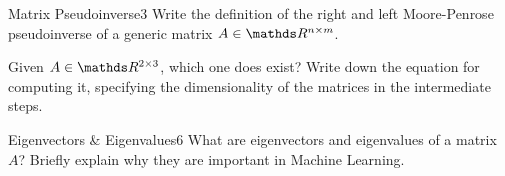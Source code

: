 \begin{questions}

\begin{question}{Matrix Pseudoinverse}{3}
	Write the definition of the right and left Moore-Penrose pseudoinverse of a generic matrix $A \in \R^{n\times m}$.
	
	Given $A \in \R^{2 \times 3}$, which one does exist? Write down the equation for computing it, specifying the dimensionality of the matrices in the intermediate steps.
	
\begin{answer}\end{answer}
\end{question}


\begin{question}{Eigenvectors \& Eigenvalues}{6}
What are eigenvectors and eigenvalues of a matrix $A$? Briefly explain why they are important in Machine Learning.

\begin{answer}\end{answer}

\end{question}


\end{questions}
